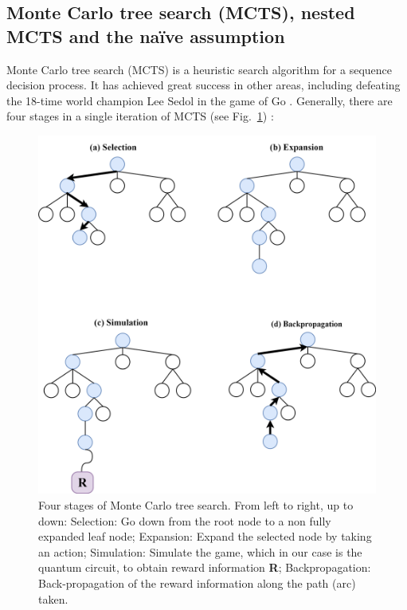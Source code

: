 \documentclass{ieeeaccess}
\begin{document}
  


  \subsection{Monte Carlo tree search (MCTS), nested MCTS and the na\"ive assumption}
  Monte Carlo tree search (MCTS) is a heuristic search algorithm for a sequence decision process. It has achieved great success in other areas, including defeating the 18-time world champion Lee Sedol in the game of Go \cite{AlphaGoDBLP:journals/nature/SilverHMGSDSAPL16, AlphaGoZeroDBLP:journals/nature/SilverSSAHGHBLB17}. Generally, there are four stages in a single iteration of MCTS (see Fig.~\ref{fig:mcts}) \cite{MCTS_for_game10.5555/3022539.3022579}:
  \begin{figure}[]
    \centering
    \includegraphics[width=0.8\linewidth]{peiyong_fig_3.png}
    \caption{Four stages of Monte Carlo tree search. From left to right, up to down: Selection: Go down from the root node to a non fully expanded leaf node; Expansion: Expand the selected node by taking an action; Simulation: Simulate the game, which in our case is the quantum circuit, to obtain reward information \textbf{R}; Backpropagation: Back-propagation of the reward information along the path (arc) taken.}
    \label{fig:mcts}
  \end{figure}
  
\end{document}
